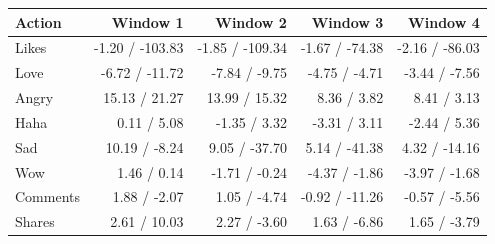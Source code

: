 \begin{tabular}{lrrrr}
\toprule
Action & Window 1 & Window 2 & Window 3 & Window 4 \\
\midrule
Likes & -1.20 / -103.83 & -1.85 / -109.34 & -1.67 / -74.38 & -2.16 / -86.03 \\
Love & -6.72 / -11.72 & -7.84 / -9.75 & -4.75 / -4.71 & -3.44 / -7.56 \\
Angry & 15.13 / 21.27 & 13.99 / 15.32 & 8.36 / 3.82 & 8.41 / 3.13 \\
Haha & 0.11 / 5.08 & -1.35 / 3.32 & -3.31 / 3.11 & -2.44 / 5.36 \\
Sad & 10.19 / -8.24 & 9.05 / -37.70 & 5.14 / -41.38 & 4.32 / -14.16 \\
Wow & 1.46 / 0.14 & -1.71 / -0.24 & -4.37 / -1.86 & -3.97 / -1.68 \\
Comments & 1.88 / -2.07 & 1.05 / -4.74 & -0.92 / -11.26 & -0.57 / -5.56 \\
Shares & 2.61 / 10.03 & 2.27 / -3.60 & 1.63 / -6.86 & 1.65 / -3.79 \\
\bottomrule
\end{tabular}
